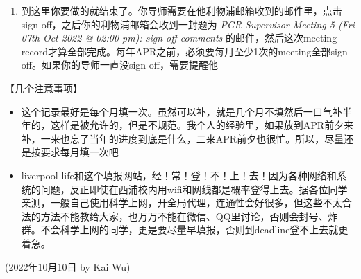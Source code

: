 \begin{enumerate}
\begin{minipage}{0.7\textwidth}
\begin{figure}[H]
            \end{figure}
        \end{minipage}
    \item 到这里你要做的就结束了。你导师需要在他利物浦邮箱收到的邮件里，点击sign off，之后你的利物浦邮箱会收到一封题为 \textit{PGR Supervisor Meeting 5 (Fri 07th Oct 2022 @ 02:00 pm): sign off comments} 的邮件，然后这次meeting record才算全部完成。每年APR之前，必须要每月至少1次的meeting全部sign off。如果你的导师一直没sign off，需要提醒他
\end{enumerate}

\vspace{5mm}
【几个注意事项】
\begin{itemize}
    \item 这个记录最好是每个月填一次。虽然可以补，就是几个月不填然后一口气补半年的，这样是被允许的，但是不规范。我个人的经验里，如果放到APR前夕来补，一来也忘了当年的进度到底是什么，二来APR前夕也很忙。所以，尽量还是按要求每月填一次吧
    \item liverpool life和这个填报网站，经！常！登！不！上！去！因为各种网络和系统的问题，反正即使在西浦校内用wifi和网线都是概率登得上去。据各位同学亲测，一般自己使用科学上网，开全局代理，连通性会好很多，但这些不太合法的方法不能教给大家，也万万不能在微信、QQ里讨论，否则会封号、炸群。不会科学上网的同学，更是要尽量早填报，否则到deadline登不上去就更着急。
\end{itemize}

\begin{flushright}
    (2022年10月10日 by Kai Wu)
    \end{flushright}